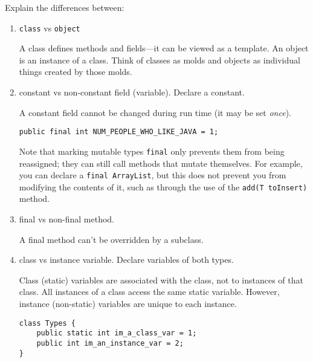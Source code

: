 Explain the differences between:
\begin{enumerate}
	\item {\tt class} vs {\tt object} \\
	\begin{answer}
	A class defines methods and fields---it can be viewed as a template. An object is an instance of a class. Think of classes as molds and objects as individual things created by those molds.
	\end{answer}	
	
	\item constant vs non-constant field (variable). Declare a constant. \\
	\begin{answer}
	A constant field cannot be changed during run time (it may be set {\em once}).
		\begin{lstlisting}[numbers=none]
public final int NUM_PEOPLE_WHO_LIKE_JAVA = 1;
		\end{lstlisting}
	Note that marking mutable types {\tt final} only prevents them from being reassigned; they can still call methods that mutate themselves. For example, you can declare a {\tt final ArrayList}, but this does not prevent you from modifying the contents of it, such as through the use of the {\tt add(T toInsert)} method.
	\end{answer}
	
	\item final vs non-final method. \\
	\begin{answer}
	A final method can't be overridden by a subclass.
	\end{answer}

	\item class vs instance variable. Declare variables of both types.\\
	\begin{answer}
	Class (static) variables are associated with the class, not to instances of that class. All instances of a class access the same static variable. However, instance (non-static) variables are unique to each instance.
		\begin{lstlisting}[numbers=none]
class Types {
	public static int im_a_class_var = 1;
	public int im_an_instance_var = 2;
}
		\end{lstlisting}
	\end{answer}
	
\end{enumerate}

